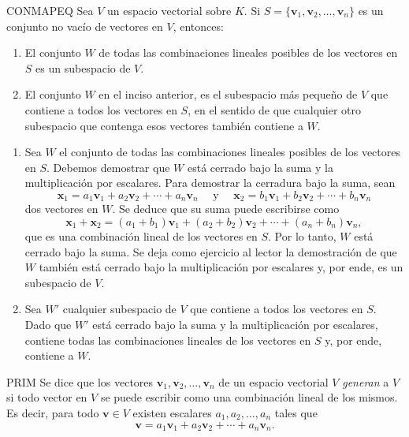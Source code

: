 \begin{theorem}{}{CONMAPEQ}
    Sea $V$ un espacio vectorial sobre $K$. Si $S = \{\mathbf{v}_1, \mathbf{v}_2, \dots, \mathbf{v}_n\}$ es un conjunto no vacío de vectores en $V$, entonces:
    \begin{enumerate}[label=\alph*), topsep=6pt, itemsep=0pt]
        \item El conjunto $W$ de todas las combinaciones lineales posibles de los vectores en $S$ es un subespacio de $V$.
        \item El conjunto $W$ en el inciso anterior, es el subespacio más pequeño de $V$ que contiene a todos los vectores en $S$, en el sentido de que cualquier otro subespacio que contenga esos vectores también contiene a $W$.
    \end{enumerate}

    \tcblower
    \demostracion
    \begin{enumerate}[label=\alph*), topsep=6pt, itemsep=0pt]
        \item Sea $W$ el conjunto de todas las combinaciones lineales posibles de los vectores en $S$. Debemos demostrar que $W$ está cerrado bajo la suma y la multiplicación por escalares. Para demostrar la cerradura bajo la suma, sean
        $$\mathbf{x}_1 = a_1\mathbf{v}_1 + a_2\mathbf{v}_2 + \cdots + a_n\mathbf{v}_n \quad \text{ y } \quad \mathbf{x}_2 = b_1\mathbf{v}_1 + b_2\mathbf{v}_2 + \cdots + b_n\mathbf{v}_n$$
        dos vectores en $W$. Se deduce que su suma puede escribirse como
        $$\mathbf{x}_1 + \mathbf{x}_2 = (a_1 + b_1) \mathbf{v}_1 + (a_2 + b_2) \mathbf{v}_2 + \cdots + (a_n + b_n) \mathbf{v}_n,$$
        que es una combinación lineal de los vectores en $S$. Por lo tanto, $W$ está cerrado bajo la suma. Se deja como ejercicio al lector la demostración de que $W$ también está cerrado bajo la multiplicación por escalares y, por ende, es un subespacio de $V$.
        \item Sea $W'$ cualquier subespacio de $V$ que contiene a todos los vectores en $S$. Dado que $W'$ está cerrado bajo la suma y la multiplicación por escalares, contiene todas las combinaciones lineales de los vectores en $S$ y, por ende, contiene a $W$.
    \end{enumerate}
\end{theorem}

\newpage

\begin{definicion}{}{PRIM}
    Se dice que los vectores $\mathbf{v}_1, \mathbf{v}_2, \dots, \mathbf{v}_n$ de un espacio vectorial $V$ \emph{generan} a $V$ si todo vector en $V$ se puede escribir como una combinación lineal de los mismos. Es decir, para todo $\mathbf{v} \in V$ existen escalares $a_1, a_2, \dots, a_n$ tales que
    $$\mathbf{v} = a_1\mathbf{v}_1 + a_2\mathbf{v}_2 + \cdots + a_n\mathbf{v}_n.$$
\end{definicion}


